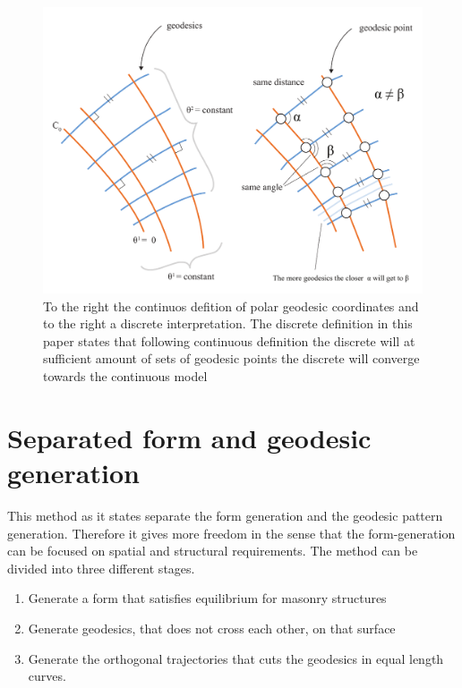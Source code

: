 \begin{figure}[H]
\centering
\includegraphics[width = 1.0\linewidth ]{figure/Method/diiscreteGeodesicCoord.pdf}
\caption{To the right the continuos defition of polar geodesic coordinates and to the right a discrete interpretation. The discrete definition in this paper states that following continuous definition the discrete will at sufficient amount of sets of geodesic points the discrete will converge towards the continuous model}
\label{fig:geoGen}
\end{figure}




\section{Separated form and geodesic generation}

This method as it states separate the form generation and the geodesic pattern generation. Therefore it gives more freedom in the sense that the form-generation can be focused on spatial and structural requirements. The method can be divided into three different stages.

\begin{enumerate}
\item Generate a form that satisfies equilibrium for masonry structures
\item Generate geodesics, that does not cross each other, on that surface
\item Generate the orthogonal trajectories that cuts the geodesics in equal length curves. 
\end{enumerate}

